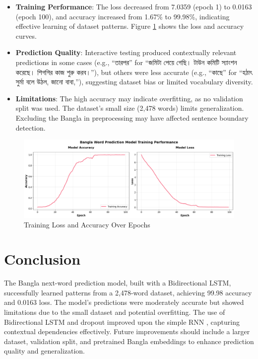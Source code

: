 \documentclass[12pt]{article}
\begin{document}
\begin{itemize}
    \item \textbf{Training Performance}: The loss decreased from 7.0359 (epoch 1) to 0.0163 (epoch 100), and accuracy increased from 1.67\% to 99.98\%, indicating effective learning of dataset patterns. Figure \ref{fig:training_plots} shows the loss and accuracy curves.
    \item \textbf{Prediction Quality}: Interactive testing produced contextually relevant predictions in some cases (e.g., {\bengalifont ``তারপর''} for {\bengalifont ``জমিটা পেয়ে গেছি। টাউন কমিটি স্যাংশন করেছে। শিগগির কাজ শুরু করব।''}), but others were less accurate (e.g., {\bengalifont ``কাছে''} for {\bengalifont ``হঠাৎ সুর্মা বলে উঠল, জানো বাবা,''}), suggesting dataset bias or limited vocabulary diversity.
    \item \textbf{Limitations}: The high accuracy may indicate overfitting, as no validation split was used. The dataset's small size (2,478 words) limits generalization. Excluding the Bangla in preprocessing may have affected sentence boundary detection.
\end{itemize}

\begin{figure}[H]
    \centering
    \caption{Training Loss and Accuracy Over Epochs}
    \label{fig:training_plots}
    \includegraphics[width=1.0\textwidth]{curves.png}
\end{figure}

\section*{Conclusion}
The Bangla next-word prediction model, built with a Bidirectional LSTM, successfully learned patterns from a 2,478-word dataset, achieving 99.98 accuracy and 0.0163 loss. The model's predictions were moderately accurate but showed limitations due to the small dataset and potential overfitting. The use of Bidirectional LSTM and dropout improved upon the simple RNN , capturing contextual dependencies effectively. Future improvements should include a larger dataset, validation split, and pretrained Bangla embeddings to enhance prediction quality and generalization.
\end{document}
